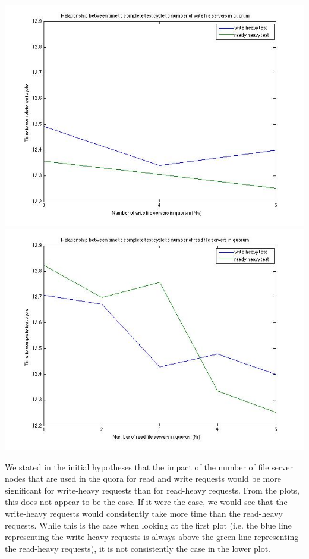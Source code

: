 \documentclass
[english,a4paper]{article}
\begin{document}
\begin{center}
\includegraphics[scale=0.6]{write_fs_quorum} \\
\includegraphics[scale=0.6]{read_fs_quorum}
\end{center}

We stated in the initial hypotheses that the impact of the number of file server
nodes that are used in the quora for read and write requests would be
more significant for write-heavy requests than for read-heavy
requests. From the plots, this does not appear to be the case. If it
were the case, we would see that the write-heavy requests would
consistently take more time than the read-heavy requests. While this
is the case when looking at the first plot (i.e. the blue line
representing the write-heavy requests is always above the green line
representing the read-heavy requests), it is not consistently the case in the lower
plot.
\end{document}
